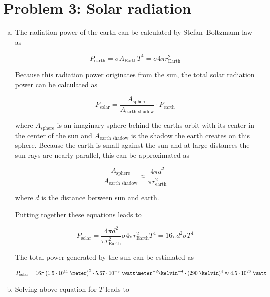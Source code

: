 \documentclass[a4paper,german,12pt,smallheadings]{scrartcl}
\begin{document}
\section*{Problem 3: Solar radiation}
\begin{enumerate}[a)]
  \item
    The radiation power of the earth can be calculated by Stefan–Boltzmann law as

    \begin{equation*}
      P_{\text{earth}} = \sigma A_{\text{Earth}} T^4 = \sigma 4 \pi r_{\text{Earth}}^2
    \end{equation*}

    Because this radiation power originates from the sun, the total solar
    radiation power can be calculated as

    \begin{equation*}
      P_{\text{solar}} = \frac{A_{\text{sphere}}}{A_{\text{earth shadow}}} \cdot P_{\text{earth}}
    \end{equation*}

    where $A_{\text{sphere}}$ is an imaginary sphere behind the earths orbit
    with its center in the center of the sun and $A_{\text{earth shadow}}$ is
    the shadow the earth creates on this sphere. Because the earth is small
    against the sun and at large distances the sun rays are nearly parallel,
    this can be approximated as

    \begin{equation*}
      \frac{A_{\text{sphere}}}{A_{\text{earth shadow}}} \approx \frac{4 \pi d^2}{\pi r_{\text{earth}}^2}
    \end{equation*}

    where $d$ is the distance between sun and earth.

    Putting together these equations leads to

    \begin{equation*}
      P_\text{solar} = \frac{4 \pi d^2}{\pi r_\text{Earth}^2} \sigma 4 \pi r_\text{Earth}^2 T^4 = 16\pi d^2 \sigma T^4
    \end{equation*}

    The total power generated by the sun can be estimated as

    \begin{equation*}
      P_\text{solar} = 16 \pi \left(1.5 \cdot 10^{11} \; \meter\right)^2 \cdot 5.67 \cdot 10^{-8}\;\watt\meter^{-2}\kelvin^{-4} \cdot (290 \; \kelvin)^4 \approx 4.5 \cdot 10^{26}\;\watt
    \end{equation*}
  \item
    Solving above equation for $T$ leads to


\end{enumerate}
\end{document}
